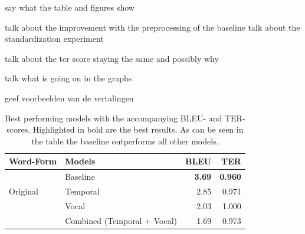 say what the table and figures show

talk about the improvement with the preprocessing of the baseline
talk about the standardization experiment

talk about the ter score staying the same and possibly why

talk what is going on in the graphs

geef voorbeelden van de vertalingen

\begin{table}
    \caption{Best performing models with the accompanying BLEU- and TER-scores. Highlighted in bold are the best results. As can be seen in the table the baseline outperforms all other models.}
    \label{tab:results}
    \begin{tabular}{llrr}
        \toprule
                                                                  
        Word-Form                   &  Models                           &  BLEU                & TER    \\ 
        \midrule
        \multirow{3}{*}{Original}  &  Baseline                              &   \textbf{3.69}      &  \textbf{0.960} \\
                              & Temporal                                &   2.85               &  0.971 \\
                              & Vocal                                   &   2.03               &  1.000 \\
                              & Combined (Temporal + Vocal)             &   1.69               &  0.973 \\
    
        
    \end{tabular}
    
\end{table}

\mydata

